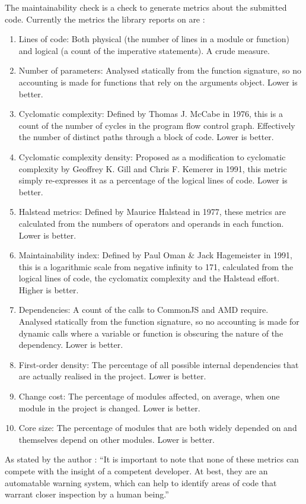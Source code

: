The maintainability check is a check to generate metrics about the submitted code.
Currently the metrics the library reports on are :
\begin{enumerate}
 \item Lines of code: Both physical (the number of lines in a module or function) and logical (a count of the imperative statements). A crude measure.
 \item Number of parameters: Analysed statically from the function signature, so no accounting is made for functions that rely on the arguments object. Lower is better.
 \item Cyclomatic complexity: Defined by Thomas J. McCabe in 1976, this is a count of the number of cycles in the program flow control graph. Effectively the number of distinct paths through a block of code. Lower is better.
 \item Cyclomatic complexity density: Proposed as a modification to cyclomatic complexity by Geoffrey K. Gill and Chris F. Kemerer in 1991, this metric simply re-expresses it as a percentage of the logical lines of code. Lower is better.
 \item Halstead metrics: Defined by Maurice Halstead in 1977, these metrics are calculated from the numbers of operators and operands in each function. Lower is better.
 \item Maintainability index: Defined by Paul Oman \& Jack Hagemeister in 1991, this is a logarithmic scale from negative infinity to 171, calculated from the logical lines of code, the cyclomatix complexity and the Halstead effort. Higher is better.
 \item Dependencies: A count of the calls to CommonJS and AMD require. Analysed statically from the function signature, so no accounting is made for dynamic calls where a variable or function is obscuring the nature of the dependency. Lower is better.
 \item First-order density: The percentage of all possible internal dependencies that are actually realised in the project. Lower is better.
 \item Change cost: The percentage of modules affected, on average, when one module in the project is changed. Lower is better.
 \item Core size: The percentage of modules that are both widely depended on and themselves depend on other modules. Lower is better.
\end{enumerate}

As stated by the author : ``It is important to note that none of these metrics can compete with the insight of a competent developer. At best, they are an automatable warning system, which can help to identify areas of code that warrant closer inspection by a human being.''


